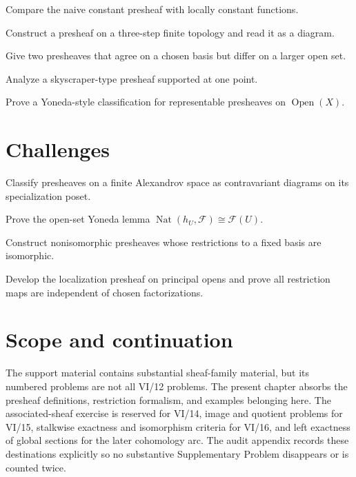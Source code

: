 \begin{problem}
Compare the naive constant presheaf with locally constant functions.
\end{problem}
\begin{problem}
Construct a presheaf on a three-step finite topology and read it as a diagram.
\end{problem}
\begin{problem}
Give two presheaves that agree on a chosen basis but differ on a larger open set.
\end{problem}
\begin{problem}
Analyze a skyscraper-type presheaf supported at one point.
\end{problem}
\begin{problem}
Prove a Yoneda-style classification for representable presheaves on $\operatorname{Open}(X)$.
\end{problem}
\fi

\section{Challenges}
\ifdefined\FullProblemDossiers

\else
\begin{problem}
Classify presheaves on a finite Alexandrov space as contravariant diagrams on its specialization poset.
\end{problem}
\begin{problem}
Prove the open-set Yoneda lemma $\operatorname{Nat}(h_U,\mathcal F)\cong\mathcal F(U)$.
\end{problem}
\begin{problem}
Construct nonisomorphic presheaves whose restrictions to a fixed basis are isomorphic.
\end{problem}
\begin{problem}
Develop the localization presheaf on principal opens and prove all restriction maps are independent of chosen factorizations.
\end{problem}
\fi

\section{Scope and continuation}

The support material contains substantial sheaf-family material, but its numbered problems are
not all VI/12 problems.  The present chapter absorbs the presheaf definitions, restriction
formalism, and examples belonging here.  The associated-sheaf exercise is reserved for
VI/14, image and quotient problems for VI/15, stalkwise exactness and isomorphism criteria for
VI/16, and left exactness of global sections for the later cohomology arc.  The audit appendix
records these destinations explicitly so no substantive Supplementary Problem disappears or is
counted twice.


